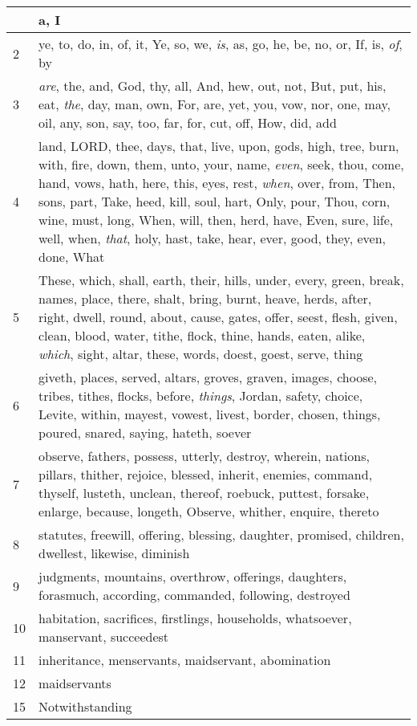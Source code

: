\begin{longtable}{l|p{3.75in}}
\hline \hline
\endlastfoot
1 & a, I \\ \hline
2 & ye, to, do, in, of, it, Ye, so, we, \emph{is}, as, go, he, be, no, or, If, is, \emph{of}, by \\ \hline
3 & \emph{are}, the, and, God, thy, all, And, hew, out, not, But, put, his, eat, \emph{the}, day, man, own, For, are, yet, you, vow, nor, one, may, oil, any, son, say, too, far, for, cut, off, How, did, add \\ \hline
4 & land, LORD, thee, days, that, live, upon, gods, high, tree, burn, with, fire, down, them, unto, your, name, \emph{even}, seek, thou, come, hand, vows, hath, here, this, eyes, rest, \emph{when}, over, from, Then, sons, part, Take, heed, kill, soul, hart, Only, pour, Thou, corn, wine, must, long, When, will, then, herd, have, Even, sure, life, well, when, \emph{that}, holy, hast, take, hear, ever, good, they, even, done, What \\ \hline
5 & These, which, shall, earth, their, hills, under, every, green, break, names, place, there, shalt, bring, burnt, heave, herds, after, right, dwell, round, about, cause, gates, offer, seest, flesh, given, clean, blood, water, tithe, flock, thine, hands, eaten, alike, \emph{which}, sight, altar, these, words, doest, goest, serve, thing \\ \hline
6 & giveth, places, served, altars, groves, graven, images, choose, tribes, tithes, flocks, before, \emph{things}, Jordan, safety, choice, Levite, within, mayest, vowest, livest, border, chosen, things, poured, snared, saying, hateth, soever \\ \hline
7 & observe, fathers, possess, utterly, destroy, wherein, nations, pillars, thither, rejoice, blessed, inherit, enemies, command, thyself, lusteth, unclean, thereof, roebuck, puttest, forsake, enlarge, because, longeth, Observe, whither, enquire, thereto \\ \hline
8 & statutes, freewill, offering, blessing, daughter, promised, children, dwellest, likewise, diminish \\ \hline
9 & judgments, mountains, overthrow, offerings, daughters, forasmuch, according, commanded, following, destroyed \\ \hline
10 & habitation, sacrifices, firstlings, households, whatsoever, manservant, succeedest \\ \hline
11 & inheritance, menservants, maidservant, abomination \\ \hline
12 & maidservants \\ \hline
15 & Notwithstanding \\ \hline
\end{longtable}






